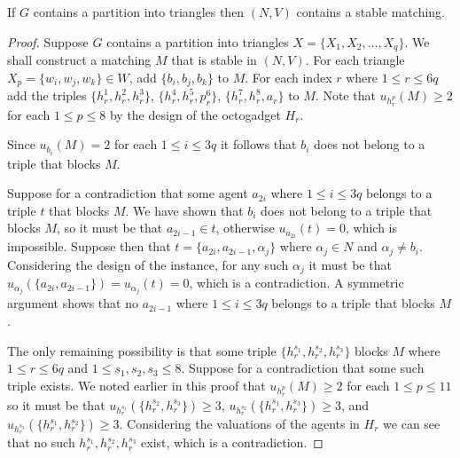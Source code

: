 \begin{lem}
\label{lem:threed_sr_as_ternary_symmetric_reduction_firstdirection}
If $G$ contains a partition into triangles then $(N, V)$ contains a stable matching.
\end{lem}
\begin{proof}
Suppose $G$ contains a partition into triangles $X = \{ X_1, X_2, \dots, X_q \}$. We shall construct a matching $M$ that is stable in $(N, V)$. For each triangle $X_p=\{ w_i, w_j, w_k \}\in W$, add $\{ b_i, b_j, b_k \}$ to $M$. For each index $r$ where $1 \leq r \leq 6q$ add the triples $\{ h_r^1, h_r^2, h_r^3 \}$, $\{ h_r^4, h_r^5, p_r^6 \}$, $\{ h_r^7, h_r^8, a_r \}$ to $M$. Note that $u_{h_r^p}(M)\geq 2$ for each $1\leq p \leq 8$ by the design of the octogadget $H_r$.

Since $u_{b_i}(M)=2$ for each $1\leq i\leq 3q$ it follows that $b_i$ does not belong to a triple that blocks $M$.

Suppose for a contradiction that some agent $a_{2i}$ where $1\leq i\leq 3q$ belongs to a triple $t$ that blocks $M$. We have shown that $b_i$ does not belong to a triple that blocks $M$, so it must be that $a_{2i-1}\in t$, otherwise $u_{a_{2i}}(t)=0$, which is impossible. Suppose then that $t=\{ a_{2i}, a_{2i-1}, \alpha_j \}$ where $\alpha_j \in N$ and $\alpha_j \neq b_i$. Considering the design of the instance, for any such $\alpha_j$ it must be that $u_{\alpha_j}(\{ a_{2i}, a_{2i-1} \})=u_{\alpha_j}(t)=0$, which is a contradiction. A symmetric argument shows that no $a_{2i-1}$ where $1\leq i \leq 3q$ belongs to a triple that blocks $M$.

The only remaining possibility is that some triple $\{ h_r^{s_1}, h_r^{s_2}, h_r^{s_3} \}$ blocks $M$ where $1\leq r\leq 6q$ and $1\leq s_1, s_2, s_3 \leq 8$. Suppose for a contradiction that some such triple exists. We noted earlier in this proof that $u_{h_r^p}(M)\geq 2$ for each $1\leq p \leq 11$ so it must be that $u_{h_r^{s_1}}(\{ h_r^{s_2}, h_r^{s_3} \}) \geq 3$, $u_{h_r^{s_2}}(\{ h_r^{s_1}, h_r^{s_3} \}) \geq 3$, and $u_{h_r^{s_3}}(\{ h_r^{s_1}, h_r^{s_2} \}) \geq 3$. Considering the valuations of the agents in $H_r$ we can see that no such $h_r^{s_1}, h_r^{s_2}, h_r^{s_3}$ exist, which is a contradiction.
\end{proof}


